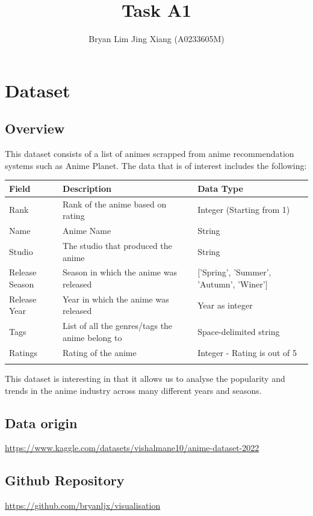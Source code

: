 \documentclass[a4paper, 11pt]{article}
\author{Bryan Lim Jing Xiang (A0233605M)}
\date{}
\title{Task A1}
\begin{document}
\maketitle
\section{Dataset}
\label{sec:orga4dd47c}
\subsection{Overview}
\label{sec:org951bf28}
This dataset consists of a list of animes scrapped from anime recommendation systems such as Anime Planet. The data that is of interest includes the following:

\begin{center}
\begin{tabular}{lll}
Field & Description & Data Type\\[0pt]
\hline
Rank & Rank of the anime based on rating & Integer (Starting from 1)\\[0pt]
Name & Anime Name & String\\[0pt]
Studio & The studio that produced the anime & String\\[0pt]
Release Season & Season in which the anime was released & ['Spring', 'Summer', 'Autumn', 'Winer']\\[0pt]
Release Year & Year in which the anime was released & Year as integer\\[0pt]
Tags & List of all the genres/tags the anime belong to & Space-delimited string\\[0pt]
Ratings & Rating of the anime & Integer - Rating is out of 5\\[0pt]
 &  & \\[0pt]
\end{tabular}
\end{center}

This dataset is interesting in that it allows us to analyse the popularity and trends in the anime industry across many different years and seasons.
\subsection{Data origin}
\label{sec:org383e295}
\url{https://www.kaggle.com/datasets/vishalmane10/anime-dataset-2022}
\subsection{Github Repository}
\label{sec:org66211e4}
\url{https://github.com/bryanljx/visualisation}
\end{document}
